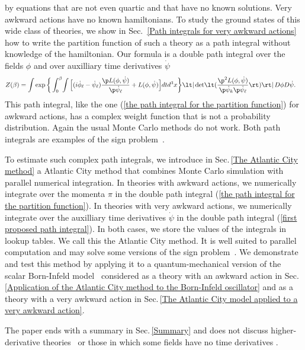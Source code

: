 \documentclass[prd,preprint,floatfix,showpacs]{revtex4-1}
\begin{document}
by equations that are not even quartic
and that have no known solutions.
Very awkward actions
have no known hamiltonians.
To study the ground states
of this wide class of theories,
we show in
Sec.~\ref {Path integrals for very awkward actions}
how to write the partition function
of such a theory as a path integral
without knowledge of the hamiltonian.
Our formula is a double path integral
over the fields \( \phi \) and over
auxilliary time derivatives \( \dot \psi \)
\begin{equation}
   \begin{split}
Z(\beta) = {}&
\! \int \exp \bigg\{ \int_0^\beta \! \int 
\Big[ ( i \dot \phi_\ell
- \dot \psi_\ell ) \frac{ \p  L(\phi, \dot \psi) }
{ \p \dot \psi_\ell }
+ L(\phi, \dot \psi) 
\Big] dt d^3x \bigg\}  \lt| \det \! 
\lt( \frac{ \p^2  L(\phi, \dot \psi) }
{ \p \dot \psi_k \p \dot \psi_\ell }  \rt) \rt|
\, D\phi D\dot\psi .
\label {first proposed path integral}
   \end{split}
\end{equation}
This path integral, like the one 
(\ref {the path integral for the partition function})
for awkward actions,
has a complex weight function
that is not a probability distribution.
Again the usual Monte Carlo methods
do not work.  
Both path integrals are examples
of the sign problem~\cite{Behtash:2015loa, *Scorzato:2015qts, *Gattringer:2016kco}.
\par
To estimate such complex path integrals,
we introduce in 
Sec.\,\ref{The Atlantic City method}
a Atlantic City method that combines
Monte Carlo simulation with parallel numerical integration.
In theories with awkward actions,
we numerically integrate over the momenta
\( \pi \) in the double path integral 
(\ref {the path integral for the partition function})\@.
In theories with very awkward actions,
we numerically integrate over the auxilliary
time derivatives \( \dot \psi \) in the double path integral 
(\ref {first proposed path integral})\@.
In both cases, we store the values of the integrals
in lookup tables.
We call this the Atlantic City method.
It is well suited to
parallel computation and may solve
some versions of the sign 
problem~\cite{Behtash:2015loa, *Scorzato:2015qts, *Gattringer:2016kco}.
We demonstrate and test this method
by applying it to a
quantum-mechanical version of the scalar Born-Infeld 
model~\cite{Born:1934gh, *Born:1934dia, *Born:1935ap}
considered as a theory with an awkward action
in
Sec.\,\ref {Application of the Atlantic City method to the Born-Infeld oscillator} and as a theory with a very awkward action in
Sec.\,\ref{The Atlantic City model applied to a very awkward action}\@.
\par
The paper ends with a summary in Sec.\,\ref{Summary}
and does not discuss higher-derivative
theories~\cite{Ostrogradsky1850,*BenderMannheim2007, *
BenderMannheim2008} 
or those in which some 
fields have no time derivatives
\cite{Dirac1950, *Dirac1958, *Dirac1964}\@.
\end{document}
